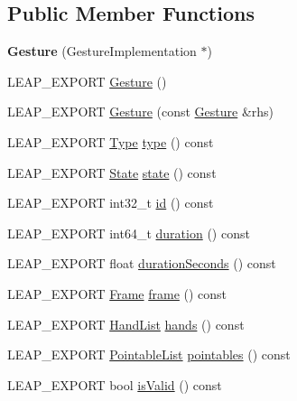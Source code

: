 \subsection*{Public Member Functions}
\begin{DoxyCompactItemize}
\item 
\mbox{\label{class_leap_1_1_gesture_a5050476dcb08d43618d82aabdf8d95f3}} 
{\bfseries Gesture} (Gesture\+Implementation $\ast$)
\item 
L\+E\+A\+P\+\_\+\+E\+X\+P\+O\+RT \hyperlink{class_leap_1_1_gesture_a703b6671d33d74dd5669b38e9c2edb15}{Gesture} ()
\item 
L\+E\+A\+P\+\_\+\+E\+X\+P\+O\+RT \hyperlink{class_leap_1_1_gesture_a958edec008098eabcd1dc93208136c5f}{Gesture} (const \hyperlink{class_leap_1_1_gesture}{Gesture} \&rhs)
\item 
L\+E\+A\+P\+\_\+\+E\+X\+P\+O\+RT \hyperlink{class_leap_1_1_gesture_a6fa6dd4f28c502f0d55abc6b71c6f9b1}{Type} \hyperlink{class_leap_1_1_gesture_a453d46397b104ad1d23887bd4ef715da}{type} () const
\item 
L\+E\+A\+P\+\_\+\+E\+X\+P\+O\+RT \hyperlink{class_leap_1_1_gesture_a068c6f3ba05970dc557b62a366073578}{State} \hyperlink{class_leap_1_1_gesture_ac33a8d4a3c01926ba8115e1706ba6c61}{state} () const
\item 
L\+E\+A\+P\+\_\+\+E\+X\+P\+O\+RT int32\+\_\+t \hyperlink{class_leap_1_1_gesture_ac5fdf7f34e05b0a771ee3084610e9c26}{id} () const
\item 
L\+E\+A\+P\+\_\+\+E\+X\+P\+O\+RT int64\+\_\+t \hyperlink{class_leap_1_1_gesture_a5f2342e2fca1949880a042a76f147cec}{duration} () const
\item 
L\+E\+A\+P\+\_\+\+E\+X\+P\+O\+RT float \hyperlink{class_leap_1_1_gesture_ac2e5253feac96ab37e6ede21e26c2640}{duration\+Seconds} () const
\item 
L\+E\+A\+P\+\_\+\+E\+X\+P\+O\+RT \hyperlink{class_leap_1_1_frame}{Frame} \hyperlink{class_leap_1_1_gesture_aed7615e15842187e1841b22d36147b70}{frame} () const
\item 
L\+E\+A\+P\+\_\+\+E\+X\+P\+O\+RT \hyperlink{class_leap_1_1_hand_list}{Hand\+List} \hyperlink{class_leap_1_1_gesture_a90bd43eed969a8e93d6ef174132b70dd}{hands} () const
\item 
L\+E\+A\+P\+\_\+\+E\+X\+P\+O\+RT \hyperlink{class_leap_1_1_pointable_list}{Pointable\+List} \hyperlink{class_leap_1_1_gesture_a1db8d13c85311388b2cd975b31d81071}{pointables} () const
\item 
L\+E\+A\+P\+\_\+\+E\+X\+P\+O\+RT bool \hyperlink{class_leap_1_1_gesture_a3130fbe24db5a9fe70793ee7d7094e58}{is\+Valid} () const

\end{DoxyCompactItemize}
